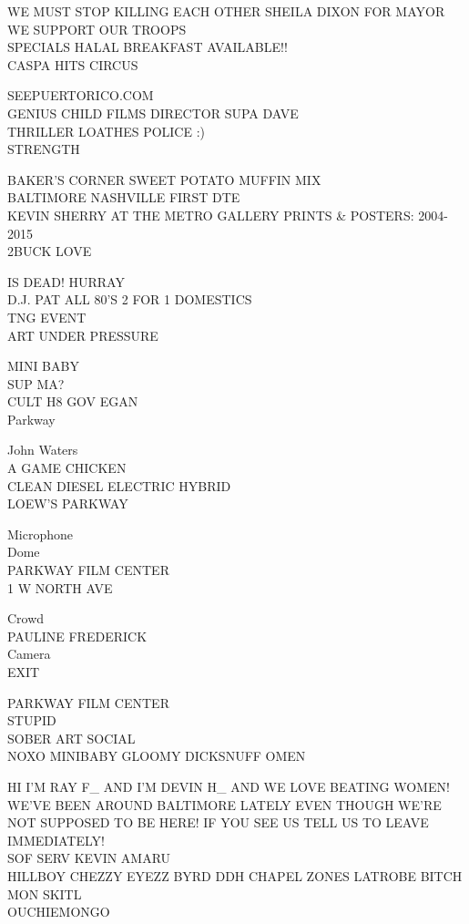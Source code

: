 \documentclass[10pt,letterpaper]{article}
\begin{document}
WE MUST STOP KILLING EACH OTHER SHEILA DIXON FOR MAYOR\\
WE SUPPORT OUR TROOPS\\
SPECIALS HALAL BREAKFAST AVAILABLE!!\\
CASPA HITS CIRCUS

SEEPUERTORICO.COM\\
GENIUS CHILD FILMS DIRECTOR SUPA DAVE\\
THRILLER LOATHES POLICE :)\\
STRENGTH

BAKER'S CORNER SWEET POTATO MUFFIN MIX\\
BALTIMORE NASHVILLE FIRST DTE\\
KEVIN SHERRY AT THE METRO GALLERY PRINTS \& POSTERS: 2004{-}2015\\
2BUCK LOVE

IS DEAD! HURRAY\\
D.J. PAT ALL 80'S 2 FOR 1 DOMESTICS\\
TNG EVENT\\
ART UNDER PRESSURE

MINI BABY\\
SUP MA?\\
CULT H8 GOV EGAN\\
Parkway

John Waters\\
A GAME CHICKEN\\
CLEAN DIESEL ELECTRIC HYBRID\\
LOEW'S PARKWAY

Microphone\\
Dome\\
PARKWAY FILM CENTER\\
1 W NORTH AVE

Crowd\\
PAULINE FREDERICK\\
Camera\\
EXIT

PARKWAY FILM CENTER\\
STUPID\\
SOBER ART SOCIAL\\
NOXO MINIBABY GLOOMY DICKSNUFF OMEN

HI I'M RAY F\_ AND I'M DEVIN H\_ AND WE LOVE BEATING WOMEN!  WE'VE BEEN AROUND BALTIMORE LATELY EVEN THOUGH WE'RE NOT SUPPOSED TO BE HERE!  IF YOU SEE US TELL US TO LEAVE IMMEDIATELY!\\
SOF SERV KEVIN AMARU\\
HILLBOY CHEZZY EYEZZ BYRD DDH CHAPEL ZONES LATROBE BITCH MON SKITL\\
OUCHIEMONGO
\end{document}
